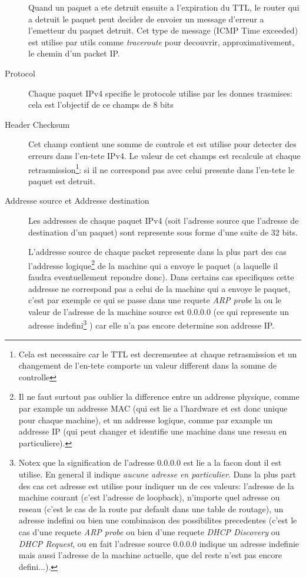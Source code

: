 \documentclass[twoside,openright,a4paper,11pt,french]{article}
\begin{document}
\begin{description}
Quand un paquet a ete detruit ensuite a l'expiration du TTL, le router qui a
detruit le paquet peut decider de envoier un message d'erreur a l'emetteur du
paquet detruit. Cet type de message (ICMP Time exceeded) est utilise par
utils comme {\it traceroute} pour decouvrir, approximativement, le chemin 
d'un packet IP.

\item [Protocol]
Chaque paquet IPv4 specifie le protocole utilise par les donnes trasmises:
cela est l'objectif de ce champs de 8 bits 

\item [Header Checksum]
Cet champ contient une somme de controle et est utilise pour detecter des 
erreurs dans l'en-tete IPv4. Le valeur de cet champs est recalcule at
chaque retrasmission\footnote {Cela est necessaire car le TTL est decrementee
at chaque retrasmission et un changement de l'en-tete comporte un valeur different
dans la somme de controlle}: si il ne correspond pas avec celui 
presente dans l'en-tete le paquet est detruit.


\item [Addresse source et Addresse destination]
Les addresses de chaque paquet IPv4 (soit l'adresse source que l'adresse de
destination d'un paquet) sont represente sous forme d'une suite de 32 bits.

L'addresse source de chaque packet represente dans la plus part des cas
l'addresse logique\footnote {Il ne faut surtout pas oublier la difference entre
un addresse physique, comme par example un addresse MAC (qui est lie a
l'hardware et est donc unique pour chaque machine), et un addresse logique,
comme par example un addresse IP (qui peut changer et identifie une machine
dans une reseau en particuliere).} de la machine qui a envoye le paquet
(a laquelle il faudra eventuellement repondre donc).  Dans certains cas
specifiques cette addresse ne correspond pas a celui de la machine qui a envoye
le paquet, c'est par exemple ce qui se passe dans une requete {\it ARP probe}
la ou le valeur de l'adresse de la machine source est 0.0.0.0 (ce qui represente
un adresse indefini\footnote {Notex que la signification de l'adresse 0.0.0.0
est lie a la facon dont il est utilise. En general il indique {\it aucune
adresse en particulier}.  Dans la plus part des cas cet adresse est utilise
pour indiquer un de ces valeurs: l'adresse de la machine courant (c'est
l'adresse de loopback), n'importe quel adresse ou reseau (c'est le cas de la
route par default dans une table de routage), un adresse indefini ou bien une
combinaison des possibilites precedentes (c'est le cas d'une requete {\it ARP
probe} ou bien d'une requete {\it DHCP Discovery} ou {\it DHCP Request}, ou en
fait l'adresse source 0.0.0.0 indique un adresse indefinie mais aussi l'adresse
de la machine actuelle, que del reste n'est pas encore defini...).}
) car elle n'a pas encore determine son addresse IP. 


\end{description}
\end{document}
